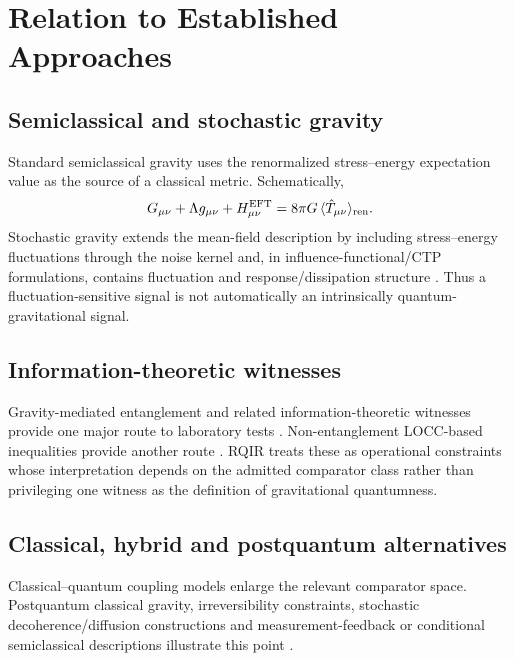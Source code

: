 \documentclass[11pt]{article}
\begin{document}
\section{Relation to Established Approaches}

\subsection{Semiclassical and stochastic gravity}

Standard semiclassical gravity uses the renormalized stress--energy expectation value as the source of a classical metric. Schematically,
\begin{equation}
 G_{\mu\nu}+\Lambda g_{\mu\nu}+H^{\rm EFT}_{\mu\nu}
 = 8\pi G\,\langle \hat T_{\mu\nu}\rangle_{\rm ren}.
\end{equation}
Stochastic gravity extends the mean-field description by including stress--energy fluctuations through the noise kernel and, in influence-functional/CTP formulations, contains fluctuation and response/dissipation structure \cite{HuVerdaguer2008}. Thus a fluctuation-sensitive signal is not automatically an intrinsically quantum-gravitational signal.

\subsection{Information-theoretic witnesses}

Gravity-mediated entanglement and related information-theoretic witnesses provide one major route to laboratory tests \cite{BoseEtAl2017,MarlettoVedral2017,MarlettoVedral2020,MarlettoVedral2025RMP}. Non-entanglement LOCC-based inequalities provide another route \cite{LamiPedernalesPlenio2024}. RQIR treats these as operational constraints whose interpretation depends on the admitted comparator class rather than privileging one witness as the definition of gravitational quantumness.

\subsection{Classical, hybrid and postquantum alternatives}

Classical--quantum coupling models enlarge the relevant comparator space. Postquantum classical gravity, irreversibility constraints, stochastic decoherence/diffusion constructions and measurement-feedback or conditional semiclassical descriptions illustrate this point \cite{Oppenheim2023,GalleyGiacominiSelby2023,OppenheimEtAl2023,Diosi2025,MikiEtAl2025}.
\end{document}
